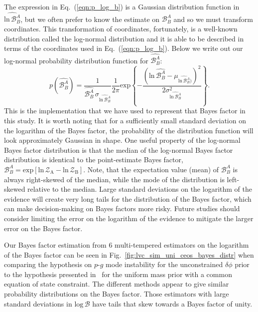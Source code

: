 The expression in Eq.~(\ref{eqn:p_log_b}) is a Gaussian distribution function in $\widehat{\mathrm{ln} \, \mathcal{B}^A_B}$, but we often prefer to know the estimate on $\mathcal{B}^A_B$ and so we must transform coordinates. This transformation of coordinates, fortunately, is a well-known distribution called the log-normal distribution and it is able to be described in terms of the coordinates used in Eq.~(\ref{eqn:p_log_b}). Below we write out our log-normal probability distribution function for $\widehat{\mathcal{B}^A_B}$:
\begin{equation}
    p(\widehat{\mathcal{B}^A_B}) = \frac{1}{\widehat{\mathcal{B}^A_B} \, \sigma_{\widehat{\mathrm{ln} \, \mathcal{B}^A_B}}} \frac{1}{2\pi} \mathrm{exp} \left \{-\frac{\left(\mathrm{ln} \, \widehat{\mathcal{B}^A_B} - \mu_{\widehat{\mathrm{ln} \, \mathcal{B}^A_B})}\right)^2} {2 \sigma^2_{\widehat{\mathrm{ln} \, \mathcal{B}^A_B}}}  \right\}.
\end{equation}
This is the implementation that we have used to represent that Bayes factor in this study. It is worth noting that for a sufficiently small standard deviation on the logarithm of the Bayes factor, the probability of the distribution function will look approximately Gaussian in shape. One useful property of the log-normal Bayes factor distribution is that the median of the log-normal Bayes factor distribution is identical to the point-estimate Bayes factor, $\mathcal{B}^A_B = \mathrm{exp} \left[\mathrm{ln} \, \mathcal{Z}_{\mathrm{A}} - \mathrm{ln} \, \mathcal{Z}_{\mathrm{B}} \right]$. Note, that the expectation value (mean) of $\mathcal{B}^A_B$ is always right-skewed of the median, while the mode of the distribution is left-skewed relative to the median. Large standard deviations on the logarithm of the evidence will create very long tails for the distribution of the Bayes factor, which can make decision-making on Bayes factors more risky. Future studies should consider limiting the error on the logarithm of the evidence to mitigate the larger error on the Bayes factor.

Our Bayes factor estimation from $6$ multi-tempered estimators on the logarithm of the Bayes factor can be seen in Fig.~\ref{fig:lvc_sim_uni_ceos_bayes_distr} when comparing the hypothesis on $p$-$g$ mode instability for the unconstrained $\delta \phi$ prior to the hypothesis presented in~\cite{de2018tidal} for the uniform mass prior with a common equation of state constraint. The different methods appear to give similar probability distributions on the Bayes factor. Those estimators with large standard deviations in $\mathrm{log} \, \mathcal{B}$ have tails that skew towards a Bayes factor of unity.

